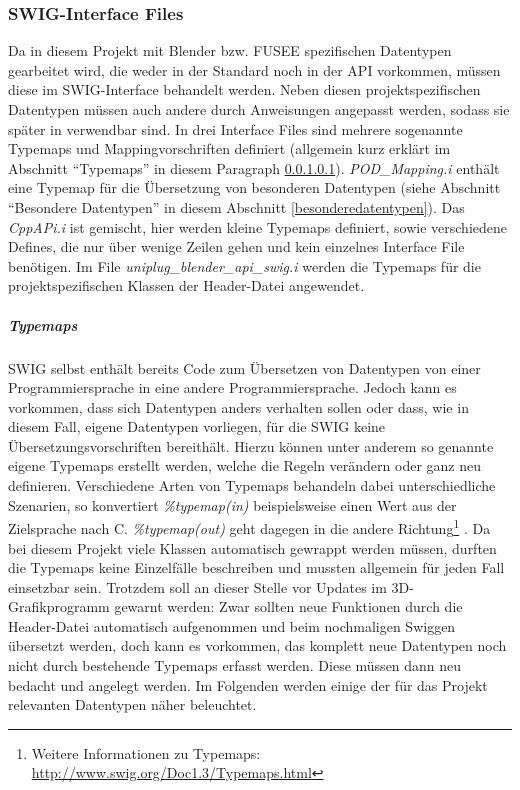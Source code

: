 \subsubsection{SWIG-Interface Files}\label{subsubsec:swiginterface}
Da in diesem Projekt mit Blender bzw. FUSEE spezifischen Datentypen gearbeitet wird, die weder in der Standard \CC noch in der \CS API vorkommen, müssen diese im SWIG-Interface behandelt werden. Neben diesen projektspezifischen Datentypen müssen auch andere durch Anweisungen angepasst werden, sodass sie später in \CS verwendbar sind. In drei Interface Files sind mehrere sogenannte Typemaps und Mappingvorschriften definiert (allgemein kurz erklärt im Abschnitt \enquote{Typemaps} in diesem Paragraph \ref{typemaps}). \emph{POD\_Mapping.i} enthält eine Typemap für die Übersetzung von besonderen Datentypen (siehe Abschnitt \enquote{Besondere Datentypen} in diesem Abschnitt \ref{besonderedatentypen}). Das \emph{CppAPi.i} ist gemischt, hier werden kleine Typemaps definiert, sowie verschiedene Defines, die nur über wenige Zeilen gehen und kein einzelnes Interface File benötigen. Im File \emph{uniplug\_blender\_api\_swig.i} werden die Typemaps für die projektspezifischen Klassen der Header-Datei angewendet.

\subparagraph{Typemaps}\label{typemaps}
SWIG selbst enthält bereits Code zum Übersetzen von Datentypen von einer Programmiersprache in eine andere Programmiersprache. Jedoch kann es vorkommen, dass sich Datentypen anders verhalten sollen oder dass, wie in diesem Fall, eigene Datentypen vorliegen, für die SWIG keine Übersetzungsvorschriften bereithält. Hierzu können unter anderem so genannte eigene Typemaps erstellt werden, welche die Regeln verändern oder ganz neu definieren. Verschiedene Arten von Typemaps behandeln dabei unterschiedliche Szenarien, so konvertiert \emph{\%typemap(in)} beispielsweise einen Wert aus der Zielsprache nach C. \emph{\%typemap(out)} geht dagegen in die andere Richtung\footnote{Weitere Informationen zu Typemaps: \url{http://www.swig.org/Doc1.3/Typemaps.html}} . Da bei diesem Projekt viele Klassen automatisch gewrappt werden müssen, durften die Typemaps keine Einzelfälle beschreiben und mussten allgemein für jeden Fall einsetzbar sein. Trotzdem soll an dieser Stelle vor Updates im 3D-Grafikprogramm gewarnt werden: Zwar sollten neue Funktionen durch die Header-Datei automatisch aufgenommen und beim nochmaligen Swiggen übersetzt werden, doch kann es vorkommen, das komplett neue Datentypen noch nicht durch bestehende Typemaps erfasst werden. Diese müssen dann neu bedacht und angelegt werden. Im Folgenden werden einige der für das Projekt relevanten Datentypen näher beleuchtet.


